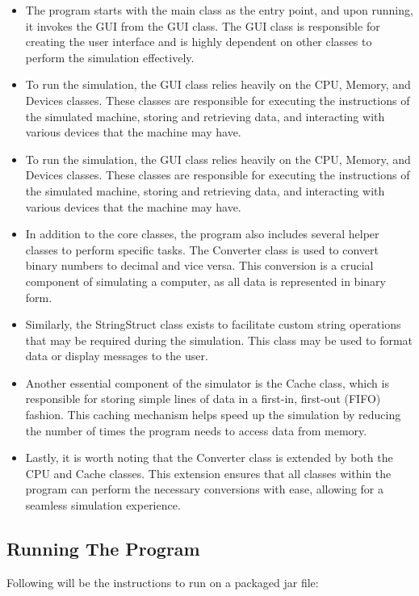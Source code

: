 \documentclass[10pt]{article}
\begin{document}
\begin{itemize}
  \item The program starts with the main class as the entry point, and upon running, it invokes the GUI from the GUI class. 
  The GUI class is responsible for creating the user interface and is highly dependent on other classes to perform the 
  simulation effectively.
  \item To run the simulation, the GUI class relies heavily on the CPU, Memory, and Devices classes. These classes are 
  responsible for executing the instructions of the simulated machine, storing and retrieving data, and interacting 
  with various devices that the machine may have.
  \item To run the simulation, the GUI class relies heavily on the CPU, Memory, and Devices classes. These classes are 
  responsible for executing the instructions of the simulated machine, storing and retrieving data, and interacting 
  with various devices that the machine may have.
  \item In addition to the core classes, the program also includes several helper classes to perform specific tasks. 
  The Converter class is used to convert binary numbers to decimal and vice versa. This conversion is a crucial 
  component of simulating a computer, as all data is represented in binary form.
  \item Similarly, the StringStruct class exists to facilitate custom string operations that may be required during 
  the simulation. This class may be used to format data or display messages to the user.
  \item Another essential component of the simulator is the Cache class, which is responsible for storing simple lines 
  of data in a first-in, first-out (FIFO) fashion. This caching mechanism helps speed up the simulation by reducing 
  the number of times the program needs to access data from memory.
  \item Lastly, it is worth noting that the Converter class is extended by both the CPU and Cache classes. 
  This extension ensures that all classes within the program can perform the necessary conversions with ease, 
  allowing for a seamless simulation experience.
\end{itemize}

\subsection{Running The Program}
Following will be the instructions to run on a packaged jar file:
\end{document}
